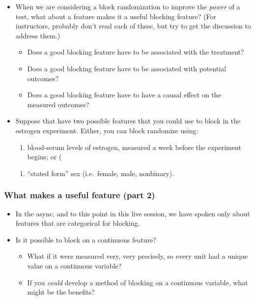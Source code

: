 \documentclass[
]{article}
\providecommand{\tightlist}{%
  \setlength{\itemsep}{0pt}\setlength{\parskip}{0pt}}
\theoremstyle{definition}
\theoremstyle{definition}
\theoremstyle{definition}
\theoremstyle{definition}
\theoremstyle{remark}
\begin{document}
\begin{itemize}
\item
  When we are considering a block randomization to improve the \emph{power} of a test, what about a feature makes it a useful blocking feature? (For instructors, probably don't read each of these, but try to get the discussion to address them.)

  \begin{itemize}
  \tightlist
  \item
    Does a good blocking feature have to be associated with the treatment?
  \item
    Does a good blocking feature have to be associated with potential outcomes?
  \item
    Does a good blocking feature have to have a causal effect on the measured outcomes?
  \end{itemize}
\item
  Suppose that have two possible features that you could use to block in the estrogen experiment. Either, you can block randomize using:

  \begin{enumerate}
  \def\labelenumi{(\alph{enumi})}
  \tightlist
  \item
    blood-serum levels of estrogen, measured a week before the experiment begins; or (
  \end{enumerate}

  \begin{enumerate}
  \def\labelenumi{\alph{enumi})}
  \setcounter{enumi}{1}
  \tightlist
  \item
    ``stated form'' sex (i.e.~female, male, nonbinary).
  \end{enumerate}
\end{itemize}

\subsubsection{What makes a useful feature (part 2)}\label{what-makes-a-useful-feature-part-2}

\begin{itemize}
\item
  In the async, and to this point in this live session, we have spoken only about features that are categorical for blocking.
\item
  Is it possible to block on a continuous feature?

  \begin{itemize}
  \tightlist
  \item
    What if it were measured very, very precisely, so every unit had a unique value on a continuous variable?
  \item
    If you \emph{could} develop a method of blocking on a continuous variable, what might be the benefits?
  \end{itemize}
\end{itemize}
\end{document}
